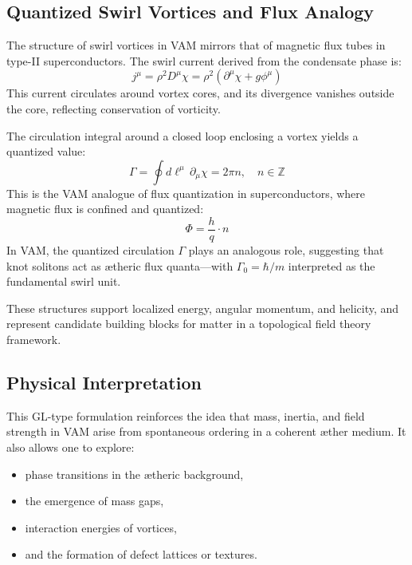         \subsection{Quantized Swirl Vortices and Flux Analogy}
        The structure of swirl vortices in VAM mirrors that of magnetic flux tubes in type-II superconductors. The swirl current derived from the condensate phase is:
        \begin{equation}
            j^\mu = \rho^2 D^\mu \chi = \rho^2 (\partial^\mu \chi + g \phi^\mu)
        \end{equation}
        This current circulates around vortex cores, and its divergence vanishes outside the core, reflecting conservation of vorticity.

        The circulation integral around a closed loop enclosing a vortex yields a quantized value:
        \begin{equation}
            \Gamma = \oint d\ell^\mu \, \partial_\mu \chi = 2\pi n, \quad n \in \mathbb{Z}
        \end{equation}
        This is the VAM analogue of flux quantization in superconductors, where magnetic flux is confined and quantized:
        \begin{equation}
            \Phi = \frac{h}{q} \cdot n
        \end{equation}
        In VAM, the quantized circulation $\Gamma$ plays an analogous role, suggesting that knot solitons act as ætheric flux quanta---with $\Gamma_0 = \hbar / m$ interpreted as the fundamental swirl unit.

        These structures support localized energy, angular momentum, and helicity, and represent candidate building blocks for matter in a topological field theory framework.

        \subsection{Physical Interpretation}
        This GL-type formulation reinforces the idea that mass, inertia, and field strength in VAM arise from spontaneous ordering in a coherent æther medium. It also allows one to explore:
        \begin{itemize}
            \item phase transitions in the ætheric background,
            \item the emergence of mass gaps,
            \item interaction energies of vortices,
            \item and the formation of defect lattices or textures.
        \end{itemize}

